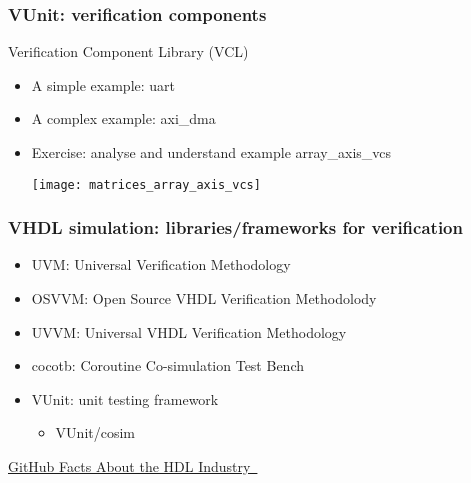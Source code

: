 \documentclass[xcolor={usenames,dvipsnames,svgnames}]{beamer}
\begin{document}
\begin{frame}
\frametitle{VUnit: verification components}
\begin{center}
Verification Component Library (VCL) \href{http://vunit.github.io/verification_components/user_guide.html}{\faBook}
\end{center}
\vfill
\begin{itemize}
  \item A simple example: uart \href{https://github.com/VUnit/vunit/tree/master/examples/vhdl/uart}{\faCode}

  \item A complex example: axi\_dma \href{https://github.com/VUnit/vunit/tree/master/examples/vhdl/axi_dma}{\faCode}

  \vfill

  \item Exercise: analyse and understand example array\_axis\_vcs
  \href{https://github.com/VUnit/vunit/tree/master/examples/vhdl/array_axis_vcs}{\faCode}

  \vfill

  \texttt{[image: matrices\_array\_axis\_vcs]}
\end{itemize}
\vfill
\end{frame}

\begin{frame}
\frametitle{VHDL simulation: libraries/frameworks for verification}
\begin{itemize}
\item UVM: Universal Verification Methodology \href{https://en.wikipedia.org/wiki/Universal_Verification_Methodology}{\faWikipediaW}

\item OSVVM: Open Source VHDL Verification Methodolody
\href{https://osvvm.org/}{\faGlobe}
\href{https://github.com/OSVVM/OSVVM}{\faGithub}

\item UVVM: Universal VHDL Verification Methodology \href{https://bitvis.no/dev-tools/uvvm/}{\faGlobe}
\href{https://github.com/UVVM}{\faGithub}

\vfill

\item cocotb: Coroutine Co-simulation Test Bench
\href{https://github.com/cocotb/cocotb}{\faGithub}
\href{https://cocotb.rtfd.io}{\faBook}
\href{http://potential.ventures/cocotb}{\faGlobe}
\href{https://pypi.org/project/cocotb/}{\faCode}

\item VUnit: unit testing framework
\href{https://github.com/VUnit/vunit}{\faGithub}
\href{http://vunit.github.io/}{\faBook}
\href{https://pypi.org/project/vunit-hdl/}{\faCode}

\begin{itemize}
\item VUnit/cosim
\href{https://github.com/VUnit/cosim}{\faGithub}
\href{https://vunit.github.io/cosim/}{\faBook}
\end{itemize}
\end{itemize}

\vfill
\centering
\href{https://larsasplund.github.io/github-facts}{GitHub Facts About the HDL Industry~\faGlobe}

\end{frame}
\end{document}
